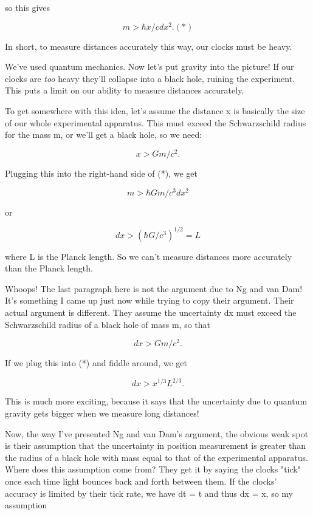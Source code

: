 so this gives

$$
m > \hbar  x / c dx^{2}.                                   (*)
$$
    
In short, to measure distances accurately this way, our clocks
must be heavy.
 
We've used quantum mechanics.  Now let's put gravity into the picture!
If our clocks are \emph{too} heavy they'll collapse into a black hole,
ruining the experiment.  This puts a limit on our ability to measure
distances accurately.

To get somewhere with this idea, let's assume the distance x is
basically the size of our whole experimental apparatus.  This must
exceed the Schwarzschild radius for the mass m, or we'll get a 
black hole, so we need:

$$
x > G m / c^{2}.
$$
    
Plugging this into the right-hand side of (*), we get 

$$
m > \hbar  G m / c^{3} dx^{2}
$$
    
or 

$$
dx > (\hbar  G / c^{3})^{1/2} = L
$$
    
where L is the Planck length.  So we can't measure distances more
accurately than the Planck length.

Whoops!  The last paragraph here is not the argument due to Ng and van
Dam!  It's something I came up just now while trying to copy their
argument.  Their actual argument is different.  They assume the
uncertainty dx must exceed the Schwarzschild radius of a black hole of
mass m, so that

$$
dx > G m / c^{2}.
$$
    
If we plug this into (*) and fiddle around, we get

$$
dx > x^{1/3} L^{2/3}.
$$
    
This is much more exciting, because it says that the uncertainty due
to quantum gravity gets bigger when we measure long distances!  

Now, the way I've presented Ng and van Dam's argument, the obvious
weak spot is their assumption that the uncertainty in position
measurement is greater than the radius of a black hole with mass equal
to that of the experimental apparatus.  Where does this assumption
come from?  They get it by saying the clocks "tick" once each time
light bounces back and forth between them.  If the clocks' accuracy 
is limited by their tick rate, we have dt = t and thus dx = x, so my
assumption

